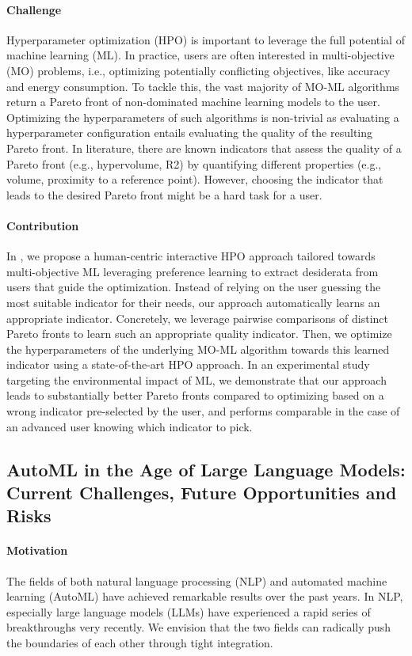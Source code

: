 \paragraph{Challenge} Hyperparameter optimization (HPO) is important to leverage the full potential of machine learning (ML).
In practice, users are often interested in multi-objective (MO) problems, i.e., optimizing potentially conflicting objectives, like accuracy and energy consumption.
To tackle this, the vast majority of MO-ML algorithms return a Pareto front of non-dominated machine learning models to the user.
Optimizing the hyperparameters of such algorithms is non-trivial as evaluating a hyperparameter configuration entails evaluating the quality of the resulting Pareto front.
In literature, there are known indicators that assess the quality of a Pareto front (e.g., hypervolume, R2) by quantifying different properties (e.g., volume, proximity to a reference point).
However, choosing the indicator that leads to the desired Pareto front might be a hard task for a user.

\paragraph{Contribution} In , we propose a human-centric interactive HPO approach tailored towards multi-objective ML leveraging preference learning to extract desiderata from users that guide the optimization.
Instead of relying on the user guessing the most suitable indicator for their needs, our approach automatically learns an appropriate indicator.
Concretely, we leverage pairwise comparisons of distinct Pareto fronts to learn such an appropriate quality indicator.
Then, we optimize the hyperparameters of the underlying MO-ML algorithm towards this learned indicator using a state-of-the-art HPO approach.
In an experimental study targeting the environmental impact of ML, we demonstrate that our approach leads to substantially better Pareto fronts compared to optimizing based on a wrong indicator pre-selected by the user, and performs comparable in the case of an advanced user knowing which indicator to pick.


\subsection*{AutoML in the Age of Large Language Models: Current Challenges, Future Opportunities and Risks}

\paragraph{Motivation} The fields of both natural language processing (NLP) and automated machine learning (AutoML) have achieved remarkable results over the past years.
In NLP, especially large language models (LLMs) have experienced a rapid series of breakthroughs very recently.
We envision that the two fields can radically push the boundaries of each other through tight integration.

